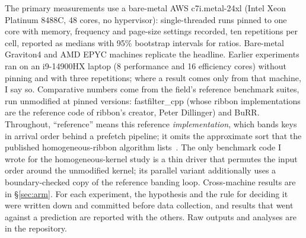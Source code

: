 \documentclass{article}
\begin{document}
The primary measurements use a bare-metal AWS c7i.metal-24xl (Intel Xeon Platinum 8488C, 48 cores, no hypervisor): single-threaded runs pinned to one core with memory, frequency and page-size settings recorded, ten repetitions per cell, reported as medians with 95\% bootstrap intervals for ratios. Bare-metal Graviton4 and AMD EPYC machines replicate the headline. Earlier experiments ran on an i9-14900HX laptop (8 performance and 16 efficiency cores) without pinning and with three repetitions; where a result comes only from that machine, I say so. Comparative numbers come from the field's reference benchmark suites, run unmodified at pinned versions: fastfilter\_cpp (whose ribbon implementations are the reference code of ribbon's creator, Peter Dillinger) and BuRR. Throughout, ``reference'' means this reference \emph{implementation}, which bands keys in arrival order behind a prefetch pipeline; it omits the approximate sort that the published homogeneous-ribbon algorithm lists~\citep{dietzfelbinger2026ribbon}. The only benchmark code I wrote for the homogeneous-kernel study is a thin driver that permutes the input order around the unmodified kernel; its parallel variant additionally uses a boundary-checked copy of the reference banding loop. Cross-machine results are in \S\ref{sec:arm}. For each experiment, the hypothesis and the rule for deciding it were written down and committed before data collection, and results that went against a prediction are reported with the others. Raw outputs and analyses are in the repository.
\end{document}
